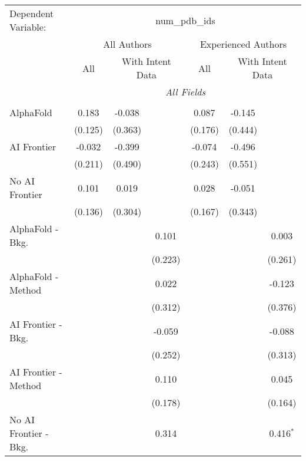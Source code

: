 \begingroup
\centering
\begin{tabular}{lcccccc}
   \tabularnewline \midrule \midrule
   Dependent Variable: & \multicolumn{6}{c}{num\_pdb\_ids}\\
 & \multicolumn{3}{c}{All Authors} & \multicolumn{3}{c}{Experienced Authors} \\
\cmidrule(lr){2-4} \cmidrule(lr){5-7}
 & \multicolumn{1}{c}{All} & \multicolumn{2}{c}{With Intent Data} & \multicolumn{1}{c}{All} & \multicolumn{2}{c}{With Intent Data} \\
\cmidrule(lr){2-2} \cmidrule(lr){3-4} \cmidrule(lr){5-5} \cmidrule(lr){6-7}
 & \multicolumn{6}{c}{\textit{All Fields}} \\ \\
   AlphaFold               & 0.183   & -0.038  &         & 0.087   & -0.145  &   \\   
                           & (0.125) & (0.363) &         & (0.176) & (0.444) &   \\   
   AI Frontier             & -0.032  & -0.399  &         & -0.074  & -0.496  &   \\   
                           & (0.211) & (0.490) &         & (0.243) & (0.551) &   \\   
   No AI Frontier          & 0.101   & 0.019   &         & 0.028   & -0.051  &   \\   
                           & (0.136) & (0.304) &         & (0.167) & (0.343) &   \\   
   AlphaFold - Bkg.        &         &         & 0.101   &         &         & 0.003\\   
                           &         &         & (0.223) &         &         & (0.261)\\   
   AlphaFold - Method      &         &         & 0.022   &         &         & -0.123\\   
                           &         &         & (0.312) &         &         & (0.376)\\   
   AI Frontier - Bkg.      &         &         & -0.059  &         &         & -0.088\\   
                           &         &         & (0.252) &         &         & (0.313)\\   
   AI Frontier - Method    &         &         & 0.110   &         &         & 0.045\\   
                           &         &         & (0.178) &         &         & (0.164)\\   
   No AI Frontier - Bkg.   &         &         & 0.314   &         &         & 0.416$^{*}$\\   

\end{tabular}
